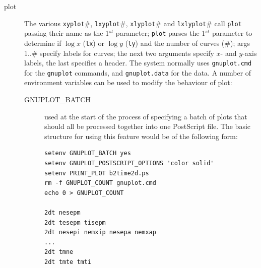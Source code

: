 \documentclass[a4paper,10pt]{report}
\begin{document}
\begin{itemize}
  \begin{description}
  \item[plot] The various {\tt xyplot}\#, {\tt lxyplot}\#, {\tt xlyplot}\# and
    {\tt lxlyplot}\# call {\tt plot} passing their name as the 1$^{st}$ parameter; {\tt plot}
    parses the 1$^{st}$ parameter to determine if $\log x$ ({\tt lx}) or $\log y$ ({\tt ly})
    and the number of curves (\#); args 1..\# specify labels for curves;
    the next two arguments specify $x$- and $y$-axis labels, the last specifies
    a header. The system normally uses {\tt gnuplot.cmd} for the
    {\tt gnuplot} commands, and {\tt gnuplot.data} for the data.  A
    number of environment variables can be used to modify the
    behaviour of plot:
    \begin{description}
    \item[GNUPLOT\_BATCH] used at the start of the process of
    specifying a batch of plots that should all be processed together
    into one PostScript file.  The basic structure for using this
    feature would be of the following form:
    \begin{verbatim}
setenv GNUPLOT_BATCH yes
setenv GNUPLOT_POSTSCRIPT_OPTIONS 'color solid'
setenv PRINT_PLOT b2time2d.ps
rm -f GNUPLOT_COUNT gnuplot.cmd
echo 0 > GNUPLOT_COUNT

2dt nesepm
2dt tesepm tisepm
2dt nesepi nemxip nesepa nemxap
...
2dt tmne
2dt tmte tmti


\end{verbatim}
\end{description}
\end{description}
\end{itemize}
\end{document}

